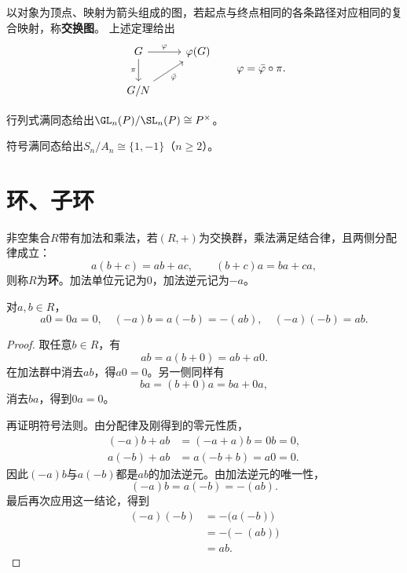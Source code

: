 \begin{definition}
以对象为顶点、映射为箭头组成的图，若起点与终点相同的各条路径对应相同的复合映射，称\textbf{交换图}。
上述定理给出
\[
\begin{tikzcd}
G \arrow[r,"\varphi"] \arrow[d,"\pi"'] & \varphi(G)\\
G/N \arrow[ur,"\bar\varphi"'] &
\end{tikzcd}
\qquad\varphi=\bar\varphi\circ\pi.
\]
\end{definition}

\begin{example}
行列式满同态给出$\GL_n(P)/\SL_n(P)\cong P^\times$。

符号满同态给出$S_n/A_n\cong\{1,-1\}$（$n\geq2$）。
\end{example}

\section{环、子环}
\begin{definition}
非空集合$R$带有加法和乘法，若$(R,+)$为交换群，乘法满足结合律，且两侧分配律成立：
\[
a(b+c)=ab+ac,\qquad(b+c)a=ba+ca,
\]
则称$R$为\textbf{环}。加法单位元记为$0$，加法逆元记为$-a$。
\end{definition}



\begin{proposition}
对$a,b\in R$，
\[
a0=0a=0,\quad(-a)b=a(-b)=-(ab),\quad(-a)(-b)=ab.
\]
\end{proposition}
\begin{proof}
取任意$b\in R$，有
\[
ab=a(b+0)=ab+a0.
\]
在加法群中消去$ab$，得$a0=0$。另一侧同样有
\[
ba=(b+0)a=ba+0a,
\]
消去$ba$，得到$0a=0$。

再证明符号法则。由分配律及刚得到的零元性质，
\[
\begin{aligned}
(-a)b+ab&=(-a+a)b=0b=0,\\
a(-b)+ab&=a(-b+b)=a0=0.
\end{aligned}
\]
因此$(-a)b$与$a(-b)$都是$ab$的加法逆元。由加法逆元的唯一性，
\[
(-a)b=a(-b)=-(ab).
\]
最后再次应用这一结论，得到
\[
\begin{aligned}
(-a)(-b)
&=-\bigl(a(-b)\bigr)\\
&=-\bigl(-(ab)\bigr)\\
&=ab.
\end{aligned}
\]
\end{proof}

